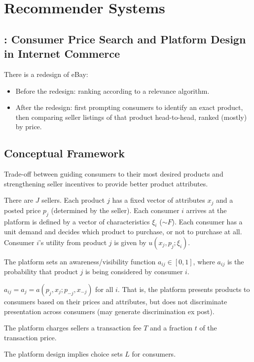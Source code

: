 \chapter{Recommender Systems}
\section{\cite{dinerstein2018consumer}: Consumer Price Search and Platform Design in Internet Commerce}
There is a redesign of eBay:
\begin{itemize}
    \item Before the redesign: ranking according to a relevance algorithm.
    \item After the redesign: first prompting consumers to identify an exact product, then comparing seller listings of that product  head-to-head, ranked (mostly) by price.
\end{itemize}

\section{Conceptual Framework}
Trade-off between guiding consumers to their most desired products and strengthening seller  incentives to provide better product attributes.

There are $J$ sellers. Each product $j$ has a fixed vector of attributes $x_j$ and a posted price $p_j$ (determined by the seller). Each consumer $i$ arrives at the platform is defined by a vector of characteristics $\xi_i$ ($\sim F$). Each consumer has a unit demand and decides which product to purchase, or not to purchase at all. Consumer $i$'s utility from product $j$ is given by $u(x_j,p_j;\xi_i)$.

The platform sets an awareness/visibility function $a_{ij}\in[0,1]$, where $a_{ij}$ is the probability that product $j$ is being considered by consumer $i$.
\begin{assumption}
    $a_{ij}=a_j=a(p_j,x_j;p_{-j},x_{-j})$ for all $i$. That is, the platform presents products to consumers based on their prices and attributes, but does not discriminate presentation across consumers (may generate discrimination ex post).
\end{assumption}
The platform charges sellers a transaction fee $T$ and a fraction $t$ of the transaction price.

The platform design implies choice sets $L$ for consumers.